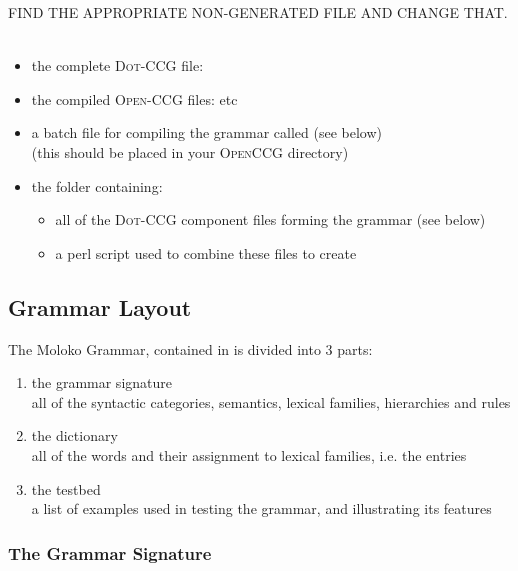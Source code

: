 FIND THE APPROPRIATE NON-GENERATED FILE AND CHANGE THAT.\\ \\
\begin{itemize}
\item the complete \textsc{Dot-CCG}  file:   \ \ \ \  
\item the compiled \textsc{Open-CCG} files:    etc
\end{itemize}
\begin{itemize}
\item a batch file for compiling the grammar called  (see below) \\
         (this should be placed in your \textsc{OpenCCG}  directory)
\item the folder  containing:
                  \begin{itemize}
		\item all of the \textsc{Dot-CCG} component files forming the grammar (see below) 
		\item a perl script  used to combine these  files to create 
		\end{itemize}
\end{itemize}		
\subsection{Grammar Layout}

The Moloko Grammar, contained in  is divided into 3 parts:
 \begin{enumerate}   
 \item the grammar signature \\ all of the syntactic categories, semantics, lexical families, hierarchies and rules
 \item the dictionary \\ all of the words and their assignment to lexical families, i.e. the entries
 \item the testbed \\ a list of examples used in testing the grammar, and illustrating its features
\end{enumerate}
 	   
\subsubsection{The Grammar Signature}

